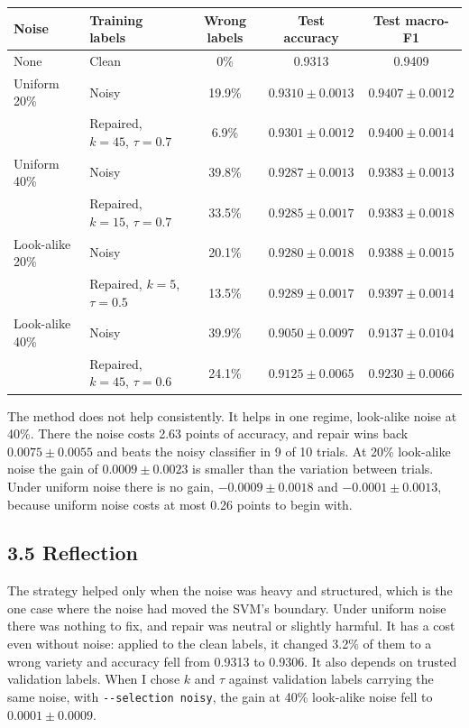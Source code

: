 \documentclass[11pt]{article}
\begin{document}
\begin{center}
\begin{tabular}{llccc}
\hline
Noise & Training labels & Wrong labels & Test accuracy & Test macro-F1\\
\hline
None & Clean & 0\% & 0.9313 & 0.9409\\
\hline
Uniform 20\% & Noisy & 19.9\% & $0.9310\pm0.0013$ & $0.9407\pm0.0012$\\
 & Repaired, $k=45$, $\tau=0.7$ & 6.9\% & $0.9301\pm0.0012$ & $0.9400\pm0.0014$\\
\hline
Uniform 40\% & Noisy & 39.8\% & $0.9287\pm0.0013$ & $0.9383\pm0.0013$\\
 & Repaired, $k=15$, $\tau=0.7$ & 33.5\% & $0.9285\pm0.0017$ & $0.9383\pm0.0018$\\
\hline
Look-alike 20\% & Noisy & 20.1\% & $0.9280\pm0.0018$ & $0.9388\pm0.0015$\\
 & Repaired, $k=5$, $\tau=0.5$ & 13.5\% & $0.9289\pm0.0017$ & $0.9397\pm0.0014$\\
\hline
Look-alike 40\% & Noisy & 39.9\% & $0.9050\pm0.0097$ & $0.9137\pm0.0104$\\
 & Repaired, $k=45$, $\tau=0.6$ & 24.1\% & $0.9125\pm0.0065$ & $0.9230\pm0.0066$\\
\hline
\end{tabular}
\end{center}

The method does not help consistently. It helps in one regime, look-alike noise at 40\%.
There the noise costs 2.63 points of accuracy, and repair wins back $0.0075\pm0.0055$ and
beats the noisy classifier in 9 of 10 trials. At 20\% look-alike noise the gain of $0.0009\pm0.0023$
is smaller than the variation between trials. Under uniform noise there is no gain,
$-0.0009\pm0.0018$ and $-0.0001\pm0.0013$, because uniform noise costs at most 0.26 points to begin with.

\subsection*{3.5 Reflection}

The strategy helped only when the noise was heavy and structured, which is the one case
where the noise had moved the SVM's boundary. Under uniform noise there was nothing to
fix, and repair was neutral or slightly harmful. It has a cost even without noise:
applied to the clean labels, it changed 3.2\% of them to a wrong variety and accuracy
fell from 0.9313 to 0.9306. It also depends on trusted validation labels. When I chose
$k$ and $\tau$ against validation labels carrying the same noise, with
\texttt{-{}-selection noisy}, the gain at 40\% look-alike noise fell to
$0.0001\pm0.0009$.
\end{document}
